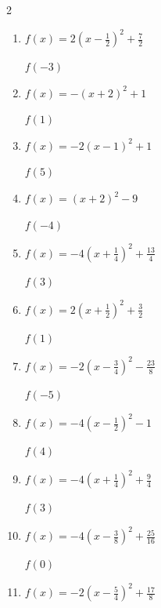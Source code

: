 \begin{multicols}{2}
\begin{enumerate}
$f(3)$
        \phantom{$=30$}

\columnbreak %

  \item $\displaystyle f(x)=2\left( x-\frac{1}{2}\right)^{2}+\frac{7}{2}$

$f(-3)$
        \phantom{$=28$}

  \item $\displaystyle f(x)=-\left( x+2\right)^{2}+1$

$f(1)$
        \phantom{$=-8$}

  \item $\displaystyle f(x)=-2\left( x-1\right)^{2}+1$

$f(5)$
        \phantom{$=-31$}

  \item $\displaystyle f(x)=\left( x+2\right)^{2}-9$

$f(-4)$
        \phantom{$=-5$}

  \item $\displaystyle f(x)=-4\left( x+\frac{1}{4}\right)^{2}+\frac{13}{4}$

$f(3)$
        \phantom{$=-39$}

\columnbreak %

\resetques

  \item $\displaystyle f(x)=2\left( x+\frac{1}{2}\right)^{2}+\frac{3}{2}$

$f(1)$
        \phantom{$=6$}

  \item $\displaystyle f(x)=-2\left( x-\frac{3}{4}\right)^{2}-\frac{23}{8}$

$f(-5)$
        \phantom{$=-69$}

  \item $\displaystyle f(x)=-4\left( x-\frac{1}{2}\right)^{2}-1$

$f(4)$
        \phantom{$=-50$}

  \item $\displaystyle f(x)=-4\left( x+\frac{1}{4}\right)^{2}+\frac{9}{4}$

$f(3)$
        \phantom{$=-40$}

  \item $\displaystyle f(x)=-4\left( x-\frac{3}{8}\right)^{2}+\frac{25}{16}$

$f(0)$
        \phantom{$=1$}

\columnbreak %

  \item $\displaystyle f(x)=-2\left( x-\frac{5}{4}\right)^{2}+\frac{17}{8}$


\end{enumerate}
\end{multicols}
